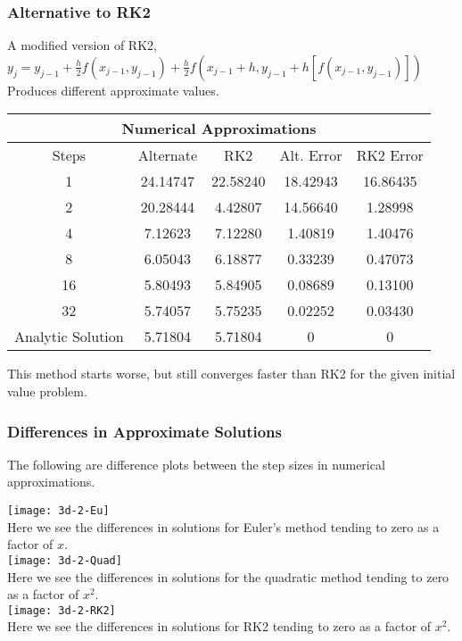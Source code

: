 \documentclass[12pt]{article}
\begin{document}
	\subsubsection{Alternative to RK2}
	
	A modified version of RK2, \\
	$y_{j}=y_{j-1}+\frac{h}{2}f(x_{j-1},y_{j-1})+\frac{h}{2}f(x_{j-1}+h,y_{j-1}+h[f(x_{j-1},y_{j-1})])$
	\\Produces different approximate values.
	
	\begin{center}
		\begin{tabular}{ |c||c|c|c|c| } 
			\hline
			\multicolumn{5}{|c|}{\textbf{Numerical Approximations}} \\
			\hline
			\hline
			Steps & Alternate & RK2 & Alt. Error & RK2 Error \\
			\hline
			1 & 24.14747 & 22.58240 & 18.42943 & 16.86435 \\ 
			\hline
			2 & 20.28444 & 4.42807 &  14.56640 & 1.28998  \\ 
			\hline
			4 & 7.12623  & 7.12280 & 1.40819  & 1.40476  \\ 
			\hline
			8 & 6.05043 & 6.18877 & 0.33239 & 0.47073 \\ 
			\hline
			16 & 5.80493 & 5.84905 & 0.08689 & 0.13100  \\ 
			\hline
			32 & 5.74057 & 5.75235 & 0.02252 &  0.03430 \\ 
			\hline
			\hline
			Analytic Solution & 5.71804 & 5.71804 & 0 & 0 \\ 
			\hline
		\end{tabular}
	\end{center}

	
	This method starts worse, but still converges faster than RK2 for the given initial value problem.
	
	\subsubsection{Differences in Approximate Solutions}
	
	The following are difference plots between the step sizes in numerical approximations. 
	
	\texttt{[image: 3d-2-Eu]}
	\\
	Here we see the differences in solutions for Euler's method tending to zero as a factor of $x$.
	\\
	\texttt{[image: 3d-2-Quad]}
	\\
	Here we see the differences in solutions for the quadratic method tending to zero as a factor of $x^{2}$.
	\\
	\texttt{[image: 3d-2-RK2]}
	\\
	Here we see the differences in solutions for RK2 tending to zero as a factor of $x^{2}$.
	
\end{document}
